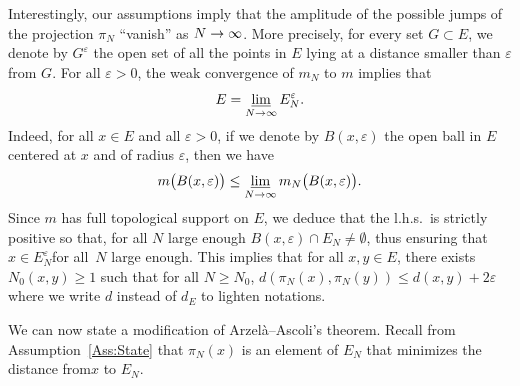 \documentclass[10pt]{amsart}
\theoremstyle{definition}\newtheorem{defi}[theo]{Definition}\newtheorem{rema}[theo]{Remark}\newtheorem{exam}[theo]{Example}\newtheorem{exem}[theo]{Example}\newtheorem{nota}[theo]{Notation}
\theoremstyle{plain}
\renewcommand*{\to}{\mathchoice{\longrightarrow}{\rightarrow}{\rightarrow}{\rightarrow}}
\begin{document}
Interestingly, our assumptions imply that the amplitude of the possible jumps of the projection $\pi_N$ ``vanish'' as $N\to\infty$. More precisely, for every set $G\subset E$, we denote by $G^\varepsilon$ the open set of all the points in $E$ lying at a distance smaller than $\varepsilon$ from $G$. For all $\varepsilon > 0$, the weak convergence of $m_N$ to $m$ implies that
\begin{equation}\label{Cond:EN}
E = \varliminf_{N\to\infty} E_N^\varepsilon .
\end{equation}
Indeed, for all $x\in E$ and all $\varepsilon >0$, if we denote by $B(x,\varepsilon)$ the open ball in $E$ centered at $x$ and of radius $\varepsilon$, then we have
\begin{equation*}
m\big(B(x,\varepsilon)\big) \leq \varliminf_{N\to\infty} m_N\big(B(x,\varepsilon)\big).
\end{equation*}
Since $m$ has full topological support on $E$, we deduce that the l.h.s.~is strictly positive so that, for all $N$ large enough $B(x,\varepsilon)\cap E_N \ne \emptyset$, thus ensuring that $x\in E_N^\varepsilon$\linebreak for all~$N$ large enough. This implies that for all $x,y \in E$, there exists $N_0(x,y)\ge 1$ such that for all $N\ge N_0$, $d(\pi_N(x), \pi_N(y)) \le d(x, y) + 2\varepsilon$ where we write $d$ instead of $d_E$ to lighten notations.

We can now state a modification of Arzelà--Ascoli's theorem. Recall from Assumption~\ref{Ass:State} that $\pi_N(x)$ is an element of $E_N$ that minimizes the distance from\linebreak $x$ to $E_N$.
\end{document}
